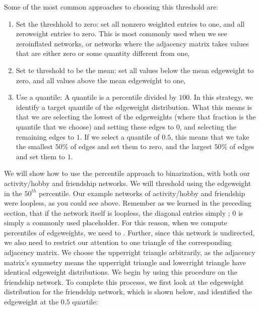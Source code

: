 \documentclass[letterpaper,10pt,english]{jupyterBook}
\begin{document}
\sphinxAtStartPar
Some of the most common approaches to choosing this threshold are:
\begin{enumerate}
%
\item {} 
\sphinxAtStartPar
Set the threshhold to zero: set all non\sphinxhyphen{}zero weighted entries to one, and all zero\sphinxhyphen{}weight entries to zero. This is most commonly used when we see zero\sphinxhyphen{}inflated networks, or networks where the adjacency matrix takes values that are either zero or some quantity different from one,

\item {} 
\sphinxAtStartPar
Set te threshold to be the mean: set all values below the mean edge\sphinxhyphen{}weight to zero, and all values above the mean edge\sphinxhyphen{}weight to one,

\item {} 
\sphinxAtStartPar
Use a quantile: A quantile is a percentile divided by \(100\). In this strategy, we identify a target quantile of the edge\sphinxhyphen{}weight distribution. What this means is that we are selecting the lowest  of the edge\sphinxhyphen{}weights (where that fraction is the quantile that we choose) and setting these edges to \(0\), and selecting the remaining edges to \(1\). If we select a quantile of \(0.5\), this means that we take the smallest \(50\%\) of edges and set them to zero, and the largest \(50\%\) of edges and set them to \(1\).

\end{enumerate}

\sphinxAtStartPar
We will show how to use the percentile approach to binarization, with both our activity/hobby and friendship networks. We will threshold using the edge\sphinxhyphen{}weight in the \(50^{th}\) percentile. Our example networks of activity/hobby and friendship were loopless, as you could see above. Remember as we learned in the preceding section, that if the network itself is loopless, the diagonal entries simply ; \(0\) is simply a commonly used placeholder. For this reason, when we compute percentiles of edge\sphinxhyphen{}weights, we need to . Further, since this network is undirected, we also need to restrict our attention to one triangle of the corresponding adjacency matrix. We choose the upper\sphinxhyphen{}right triangle arbitrarily, as the adjacency matrix’s symmetry means the upper\sphinxhyphen{}right triangle and lower\sphinxhyphen{}right triangle have identical edge\sphinxhyphen{}weight distributions. We begin by using this procedure on the friendship network. To complete this processs, we first look at the edge\sphinxhyphen{}weight distribution for the friendship network, which is shown below, and identified the edge\sphinxhyphen{}weight at the \(0.5\) quartile:
\end{document}
